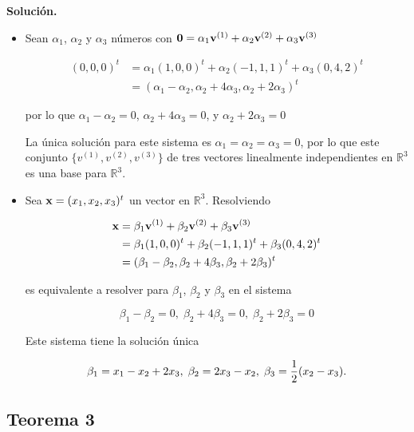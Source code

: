 \documentclass{report}
\numberwithin{subsection}{section} %
\begin{document}
{\bf Solución.}

\begin{itemize}

    \item Sean $\alpha_1$, $\alpha_2$ y $\alpha_3$ números con ${\bf 0} = \alpha_1{\bf v}^{(1)} + \alpha_2{\bf v}^{(2)} + \alpha_3{\bf v}^{(3)}$
    
    \begin{align*}
        (0,0,0)^t & = \alpha_1(1,0,0)^t + \alpha_2(-1,1,1)^t + \alpha_3(0,4,2)^t \\
        & = (\alpha_1 - \alpha_2, \alpha_2 + 4\alpha_3, \alpha_2 + 2\alpha_3)^t
    \end{align*}

    por lo que $\alpha_1 - \alpha_2 = 0$, $\alpha_2 + 4\alpha_3 = 0$, y $\alpha_2 + 2\alpha_3 = 0$

    La única solución para este sistema es $\alpha_1 = \alpha_2 = \alpha_3 = 0$, por lo que este conjunto $\{v^{(1)}, v^{(2)}, v^{(3)}\}$ de tres vectores linealmente independientes en $\mathbb{R}^3$ es una base para $\mathbb{R}^3$.

    \item Sea ${\bf x} = (x_1, x_2, x_3)^t$ un vector en $\mathbb{R}^3$. Resolviendo
    
    \begin{align*}
        {\bf x} & = \beta_1{\bf v}^{(1)} + \beta_2{\bf v}^{(2)} + \beta_3{\bf v}^{(3)} \\
                & = \beta_1(1,0,0)^t + \beta_2(-1,1,1)^t + \beta_3(0,4,2)^t \\
                & = (\beta_1 - \beta_2, \beta_2 + 4\beta_3, \beta_2 + 2\beta_3)^t
    \end{align*}

    es equivalente a resolver para $\beta_1$, $\beta_2$ y $\beta_3$ en el sistema

    $$\beta_1 - \beta_2 = 0, \; \beta_2 + 4\beta_3 = 0, \; \beta_2 + 2\beta_3 = 0$$

    Este sistema tiene la solución única

    $$\beta_1 = x_1 - x_2 + 2x_3, \; \beta_2 = 2x_3 - x_2, \; \beta_3 = {1 \over 2}(x_2 - x_3).$$
    
\end{itemize}

\subsection{\textnormal{Teorema 3}}
\end{document}
